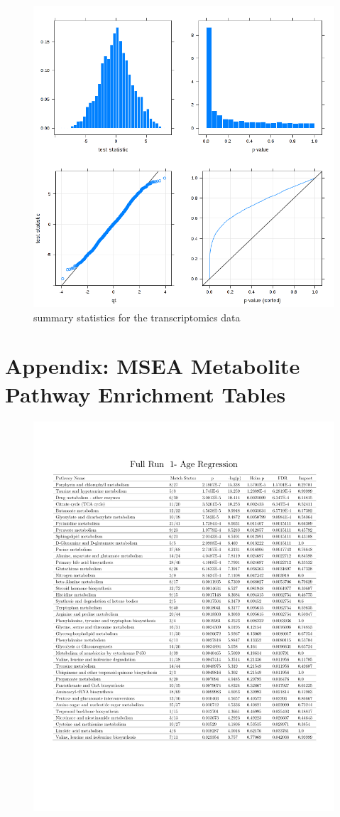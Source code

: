 \documentclass[a4paper]{book}
\begin{document}
\begin{subappendices}
\begin{figure}[ht]
	\includegraphics[width=0.8\linewidth]{Appendix_FIgures/protomics_overview_statistics.png}
	\caption{summary statistics for the transcriptomics data}
\end{figure}
\clearpage


\section{Appendix: MSEA Metabolite Pathway Enrichment Tables }

\begin{figure}
	\centering
	\includegraphics[width=\linewidth]{3.Metabolomics/MSEA_charts_1.pdf}
\end{figure}


\end{subappendices}
\end{document}
